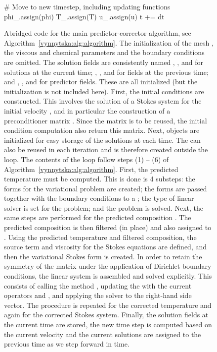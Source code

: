 \begin{figure}
\begin{python}
    # Move to new timestep, including updating functions
    phi_.assign(phi)
    T_.assign(T)
    u_.assign(u)
    t += dt
    \end{python}
    \caption{Abridged code for the main predictor-corrector algorithm,
      see Algorithm~\ref{vynnytska:alg:algorithm}. The initialization
      of the mesh , the viscous and chemical parameters and
      the boundary conditions are omitted. The solution fields are
      consistently named , , and  for
      solutions at the current time; , ,
      and  for fields at the previous time;
      and , , and  for predictor
      fields. These  are all initialized (but the
      initialization is not included here).
%
      First, the initial conditions are constructed. This involves the
      solution of a Stokes system for the initial velocity ,
      and in particular the construction of a preconditioner matrix
      . Since the matrix is to be reused, the initial
      condition computation also return this matrix. Next,
       objects are initialized for easy storage of
      the solutions at each time. The  can also be
      reused in each iteration and is therefore created outside the
      loop.
%
      The contents of the loop follow steps (1) -- (6) of
      Algorithm~\ref{vynnytska:alg:algorithm}. First, the predicted
      temperature  must be computed. This is done is 4
      substeps: the forms for the variational problem are created;
      the forms are passed together with the boundary conditions to a
      ; the type of linear solver is set for
      the problem; and the problem is solved. Next, the same steps are
      performed for the predicted composition . The
      predicted composition is then filtered (in place) and also
      assigned to .
%
      Using the predicted temperature and filtered composition, the
      source term and viscosity for the Stokes equations are defined,
      and then the variational Stokes form is created. In order to
      retain the symmetry of the matrix under the application of
      Dirichlet boundary conditions, the linear system is assembled
      and solved explicitly. This consists of calling the method
      , updating the  with
      the current operators  and , and applying the
      solver to the right-hand side vector. The procedure is repeated
      for the corrected temperature and again for the corrected Stokes
      system.
%
      Finally, the solution fields at the current time are stored, the
      new time step  is computed based on the current velocity
      and the current solutions are assigned to the previous time as
      we step forward in time.}
  \label{vynnytska:fig:mainalgorithm}
\end{figure}

